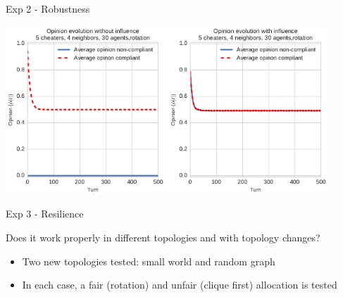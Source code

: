 \begin{frame}{Exp 2 - Robustness}

\includegraphics[width=0.45000\textwidth]{pics/voices_rotation_noinfluence_5cheaters_4nei_30agents-opinions.pdf}
\includegraphics[width=0.45000\textwidth]{pics/voices_rotation_influence_5cheaters_4nei_30agents-opinions.pdf}

\end{frame}

\begin{frame}{Exp 3 - Resilience}

\begin{block}{}
Does it work properly in different topologies and with topology changes?
\end{block}

\begin{itemize}
\tightlist
\item
  Two new topologies tested: small world and random graph 
\item
  In each case, a fair (rotation) and unfair (clique first) allocation
  is tested
\end{itemize}

\end{frame}

